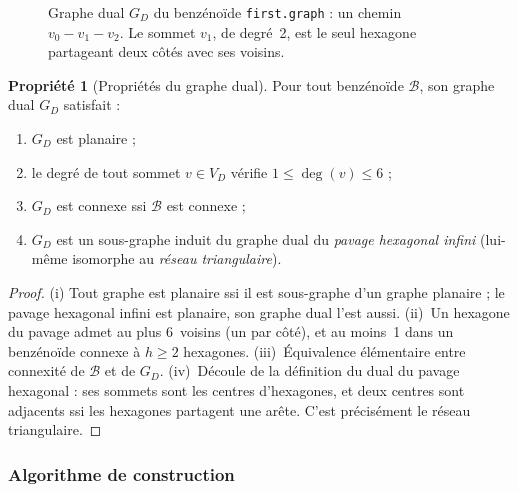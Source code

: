 \documentclass[12pt,a4paper]{article}
\theoremstyle{definition}
\newtheorem{propriete}[definition]{Propri\'et\'e}
\theoremstyle{remark}
\newcommand{\B}{\mathcal{B}}
\newcommand{\GD}{G_{\!D}}
\newcommand{\VD}{V_{\!D}}
\newcommand{\degv}{\deg(v)}
\begin{document}
\begin{figure}[!ht]
\centering
{}
\caption{Graphe dual $\GD$ du benz\'eno\"ide \texttt{first.graph} :
un chemin $v_0 - v_1 - v_2$. Le sommet $v_1$, de degr\'e~2, est le seul
hexagone partageant deux c\^ot\'es avec ses voisins.}
\label{fig:dual-first}
\end{figure}

\begin{propriete}[Propri\'et\'es du graphe dual]
\label{prop:dual}
Pour tout benz\'eno\"ide $\B$, son graphe dual $\GD$ satisfait :
\begin{enumerate}[label=(\roman*),leftmargin=*]
  \item $\GD$ est planaire ;
  \item le degr\'e de tout sommet $v \in \VD$ v\'erifie $1 \leq \degv \leq 6$ ;
  \item $\GD$ est connexe ssi $\B$ est connexe ;
  \item $\GD$ est un sous-graphe induit du graphe dual du \emph{pavage
        hexagonal infini} (lui-m\^eme isomorphe au \emph{r\'eseau
        triangulaire}).
\end{enumerate}
\end{propriete}

\begin{proof}
(i) Tout graphe est planaire ssi il est sous-graphe d'un graphe planaire ;
le pavage hexagonal infini est planaire, son graphe dual l'est aussi.
(ii)~Un hexagone du pavage admet au plus 6~voisins (un par c\^ot\'e), et
au moins~1 dans un benz\'eno\"ide connexe \`a $h \geq 2$ hexagones.
(iii)~\'Equivalence \'el\'ementaire entre connexit\'e de $\B$ et de
$\GD$. (iv)~D\'ecoule de la d\'efinition du dual du pavage hexagonal :
ses sommets sont les centres d'hexagones, et deux centres sont adjacents
ssi les hexagones partagent une ar\^ete. C'est pr\'ecis\'ement le
r\'eseau triangulaire.
\end{proof}

\subsubsection{Algorithme de construction}
\end{document}

